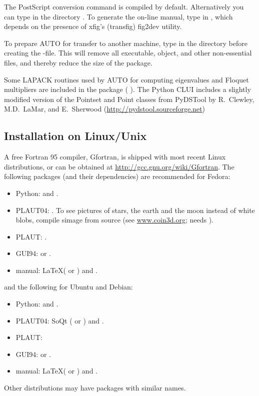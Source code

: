 \documentclass[12pt]{report}
\begin{document}
The PostScript conversion command  is compiled by
default. Alternatively you can type  in the directory
.
To generate the on-line manual, type  in
, which depends on the presence of xfig's
(transfig) fig2dev utility.

To prepare {\cal AUTO} for transfer to another machine,
type 
in the directory  before creating the -file. 
This will remove all executable, object, and other non-essential files, and
thereby reduce the size of the package.

Some {\cal LAPACK} routines used by {\cal AUTO} for computing eigenvalues and
Floquet multipliers are included in the package
( \citeyear{LAPACK:99}).
The Python CLUI includes a slightly modified version of the Pointset
and Point classes from PyDSTool by R.~Clewley, M.D.~LaMar, and E.~Sherwood
(\url{http://pydstool.sourceforge.net})

\subsection{Installation on Linux/Unix}
A free Fortran 95 compiler, Gfortran, is shipped with most recent
Linux distributions, or can be obtained at 
\url{http://gcc.gnu.org/wiki/Gfortran}.
The following packages (and their dependencies) are recommended for
Fedora:
\begin{itemize}
\item Python:  and .
\item {\cal PLAUT04}: . To see pictures of stars, the earth
and the moon instead of white blobs, compile simage from
source (see \url{www.coin3d.org}; needs ).
\item {\cal PLAUT}: .
\item GUI94:  or .
\item manual: \LaTeX ( or ) and .
\end{itemize}
and the following for Ubuntu and Debian:
\begin{itemize}
\item Python:  and .
\item {\cal PLAUT04}: SoQt ( or ) and
.
\item {\cal PLAUT}: 
\item GUI94:  or .
\item manual: \LaTeX ( or ) and .
\end{itemize}
Other distributions may have packages with similar names.
\end{document}

